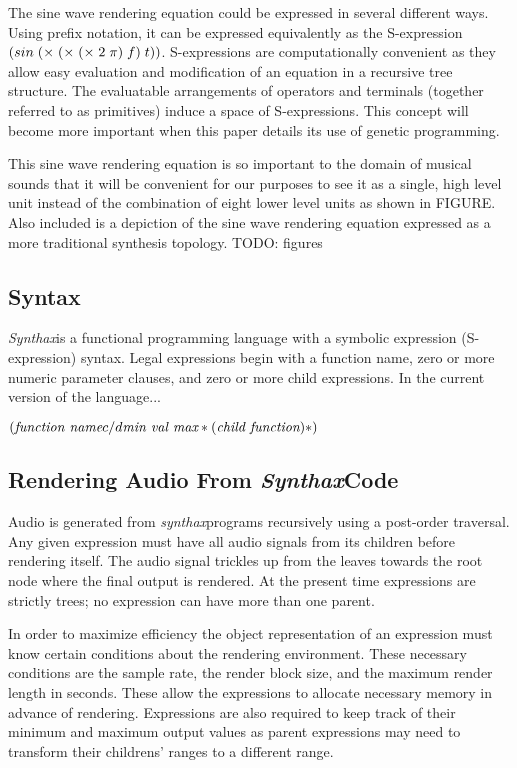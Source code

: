 \documentclass[12pt]{article}
\newcommand{\audiolanguagenamelower}{\emph{synthax}}
\newcommand{\audiolanguagenameupper}{\emph{Synthax}}
\begin{document}
The sine wave rendering equation could be expressed in several different ways. Using prefix notation, it can be expressed equivalently as the S-expression $\sexp{({sin} (\times (\times (\times 2 \pi) f) t))}$. S-expressions are computationally convenient as they allow easy evaluation and modification of an equation in a recursive tree structure. The evaluatable arrangements of operators and terminals (together referred to as primitives) induce a space of S-expressions. This concept will become more important when this paper details its use of genetic programming.
	
This sine wave rendering equation is so important to the domain of musical sounds that it will be convenient for our purposes to see it as a single, high level unit instead of the combination of eight lower level units as shown in FIGURE. Also included is a depiction of the sine wave rendering equation expressed as a more traditional synthesis topology. TODO: figures



\subsection{Syntax}\label{SYNTAX}
\audiolanguagenameupper is a functional programming language with a symbolic expression (S-expression) syntax. Legal expressions begin with a function name, zero or more numeric parameter clauses, and zero or more child expressions. In the current version of the language...

$(\emph{function name} {c/d \emph{min val max}}* (\emph{child function})*)$


\subsection{Rendering Audio From \audiolanguagenameupper Code}\label{RENDER}
Audio is generated from \audiolanguagenamelower programs recursively using a post-order traversal. Any given expression must have all audio signals from its children before rendering itself. The audio signal trickles up from the leaves towards the root node where the final output is rendered. At the present time expressions are strictly trees; no expression can have more than one parent.

In order to maximize efficiency the object representation of an expression must know certain conditions about the rendering environment. These necessary conditions are the sample rate, the render block size, and the maximum render length in seconds. These allow the expressions to allocate necessary memory in advance of rendering. Expressions are also required to keep track of their minimum and maximum output values as parent expressions may need to transform their childrens' ranges to a different range.
\end{document}

